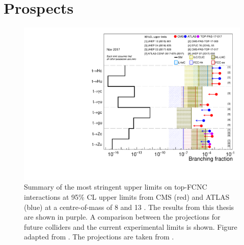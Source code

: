 \section{Prospects}
\begin{figure}[htbp]
	\centering
	\includegraphics[width=0.7\linewidth]{7_Conclusion/Figures/fcnc_upperlimits_proj.pdf}
	\caption{Summary of the most stringent upper limits on top-FCNC interactions at 95\% CL upper limits from CMS (red) and ATLAS (blue) at a centre-of-mass of 8 and 13 \TeV. The results from this thesis are shown in purple. A comparison between the projections for future colliders and the current experimental limits is shown. Figure adapted from \cite{summarywiki}. The projections are taken from \cite{Liu:2015kkp,Agashe:2013hma,Khanpour:2014xla,Mangano:2016jyj}.}
	\label{fig:fcncupperlimitproj}
\end{figure}